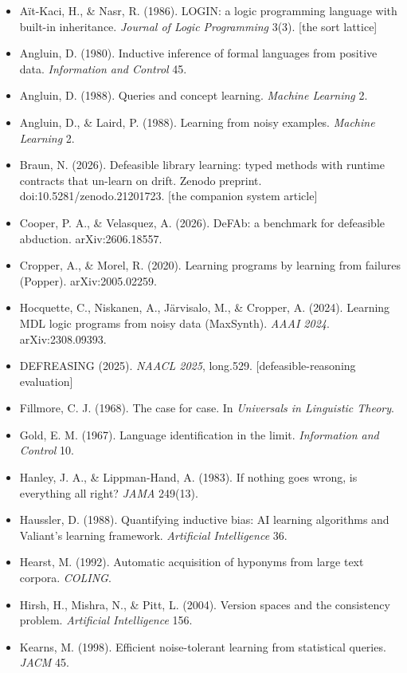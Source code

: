 \documentclass[11pt]{article}
\begin{document}
\begin{itemize}
\item Aït-Kaci, H., \& Nasr, R. (1986). LOGIN: a logic programming language with built-in inheritance. \emph{Journal of Logic Programming} 3(3). [the sort lattice]
\item Angluin, D. (1980). Inductive inference of formal languages from positive data. \emph{Information and Control} 45.
\item Angluin, D. (1988). Queries and concept learning. \emph{Machine Learning} 2.
\item Angluin, D., \& Laird, P. (1988). Learning from noisy examples. \emph{Machine Learning} 2.
\item Braun, N. (2026). Defeasible library learning: typed methods with runtime contracts that un-learn on drift. Zenodo preprint. doi:10.5281/zenodo.21201723. [the companion system article]
\item Cooper, P. A., \& Velasquez, A. (2026). DeFAb: a benchmark for defeasible abduction. arXiv:2606.18557.
\item Cropper, A., \& Morel, R. (2020). Learning programs by learning from failures (Popper). arXiv:2005.02259.
\item Hocquette, C., Niskanen, A., Järvisalo, M., \& Cropper, A. (2024). Learning MDL logic programs from noisy data (MaxSynth). \emph{AAAI 2024}. arXiv:2308.09393.
\item DEFREASING (2025). \emph{NAACL 2025}, long.529. [defeasible-reasoning evaluation]
\item Fillmore, C. J. (1968). The case for case. In \emph{Universals in Linguistic Theory}.
\item Gold, E. M. (1967). Language identification in the limit. \emph{Information and Control} 10.
\item Hanley, J. A., \& Lippman-Hand, A. (1983). If nothing goes wrong, is everything all right? \emph{JAMA} 249(13).
\item Haussler, D. (1988). Quantifying inductive bias: AI learning algorithms and Valiant's learning framework. \emph{Artificial Intelligence} 36.
\item Hearst, M. (1992). Automatic acquisition of hyponyms from large text corpora. \emph{COLING}.
\item Hirsh, H., Mishra, N., \& Pitt, L. (2004). Version spaces and the consistency problem. \emph{Artificial Intelligence} 156.
\item Kearns, M. (1998). Efficient noise-tolerant learning from statistical queries. \emph{JACM} 45.

\end{itemize}
\end{document}
